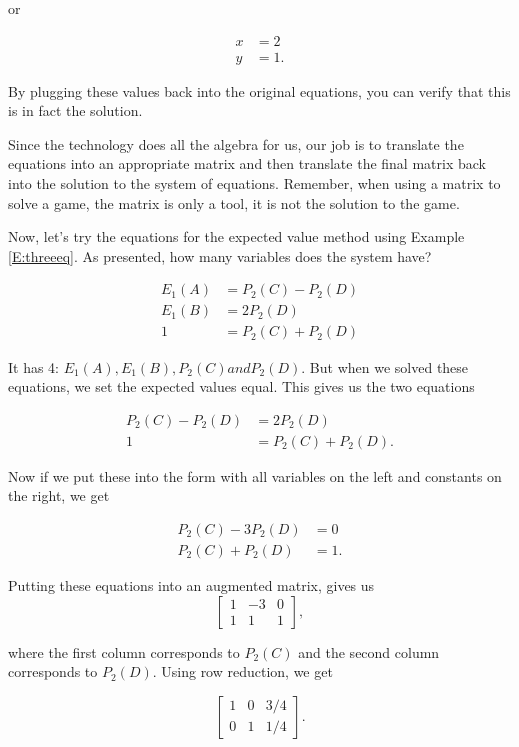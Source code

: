 or 

\begin{align*}
x &=2\\
y &= 1.
\end{align*}

By plugging these values back into the original equations, you can verify that this is in fact the solution.

Since the technology does all the algebra for us, our job is to translate the equations into an appropriate matrix and then translate the final matrix back into the solution to the system of equations. Remember, when using a matrix to solve a game, the matrix is only a tool, it is not the solution to the game.

Now, let's try the equations for the expected value method using Example \ref{E:threeeq}. As presented, how many variables does the system have?

\begin{align*}
E_1(A) &= P_2(C)-P_2(D)\\
E_1(B) &= 2P_2(D)\\
1 &= P_2(C)+P_2(D)
\end{align*}

It has 4: $E_1(A), E_1(B), P_2(C) and P_2(D)$. But when we solved these equations, we set the expected values equal. This gives us the two equations

\begin{align*}
P_2(C)-P_2(D) &= 2P_2(D)\\
1 &= P_2(C)+P_2(D).
\end{align*}

Now if we put these into the form with all variables on the left and constants on the right, we get 

\begin{align*}
P_2(C)-3P_2(D) &= 0\\
 P_2(C)+P_2(D) &= 1.
\end{align*}

Putting these equations into an augmented matrix, gives us
\[
\left[
\begin{matrix}
1 & -3 & 0\\
1 & 1 & 1
\end{matrix}
\right],
\]

where the first column corresponds to $P_2(C)$ and the second column corresponds to $P_2(D)$. Using row reduction, we get

\[
\left[
\begin{matrix}
1 & 0 & 3/4\\
0 & 1 & 1/4
\end{matrix}
\right].
\]

